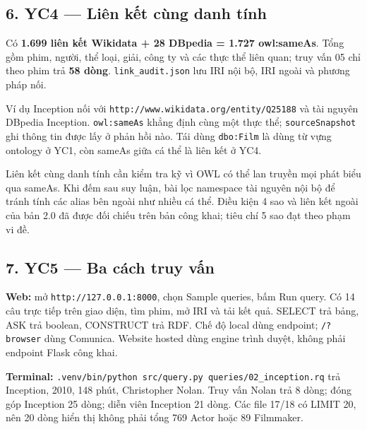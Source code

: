 \documentclass[
  11pt,
]{article}
\begin{document}
\newpage

\subsection{6. YC4 --- Liên kết cùng danh
tính}\label{yc4-liuxean-kux1ebft-cuxf9ng-danh-tuxednh}

Có \textbf{1.699 liên kết Wikidata + 28 DBpedia = 1.727 owl:sameAs}.
Tổng gồm phim, người, thể loại, giải, công ty và các thực thể liên quan;
truy vấn 05 chỉ theo phim trả \textbf{58 dòng}.
\texttt{link\_\allowbreak{}aud\allowbreak{}it.\allowbreak{}json} lưu IRI
nội bộ, IRI ngoài và phương pháp nối.

Ví dụ Inception nối với
\texttt{http:\allowbreak{}/\allowbreak{}/\allowbreak{}w\allowbreak{}ww.\allowbreak{}wikid\allowbreak{}ata.\allowbreak{}org/\allowbreak{}entity/\allowbreak{}\allowbreak{}Q\allowbreak{}25188}
và tài nguyên DBpedia Inception.
\texttt{owl:\allowbreak{}same\allowbreak{}\allowbreak{}As} khẳng định
cùng một thực thể; \texttt{source\allowbreak{}Sn\allowbreak{}apshot} ghi
thông tin được lấy ở phản hồi nào. Tái dùng
\texttt{dbo:\allowbreak{}\allowbreak{}Film\allowbreak{}} là dùng từ vựng
ontology ở YC1, còn sameAs giữa cá thể là liên kết ở YC4.

Liên kết cùng danh tính cần kiểm tra kỹ vì OWL có thể lan truyền mọi
phát biểu qua sameAs. Khi đếm sau suy luận, bài lọc namespace tài nguyên
nội bộ để tránh tính các alias bên ngoài như nhiều cá thể. Điều kiện 4
sao và liên kết ngoài của bản 2.0 đã được đối chiếu trên bản công khai;
tiêu chí 5 sao đạt theo phạm vi đề.

\subsection{7. YC5 --- Ba cách truy
vấn}\label{yc5-ba-cuxe1ch-truy-vux1ea5n}

\textbf{Web:} mở
\texttt{http:\allowbreak{}/\allowbreak{}/\allowbreak{}1\allowbreak{}27.\allowbreak{}0.\allowbreak{}0.\allowbreak{}1\allowbreak{}:\allowbreak{}8000},
chọn Sample queries, bấm Run query. Có 14 câu trực tiếp trên giao diện,
tìm phim, mở IRI và tải kết quả. SELECT trả bảng, ASK trả boolean,
CONSTRUCT trả RDF. Chế độ local dùng endpoint;
\texttt{/\allowbreak{}?browse\allowbreak{}r} dùng Comunica. Website
hosted dùng engine trình duyệt, không phải endpoint Flask công khai.

\textbf{Terminal:}
\texttt{.\allowbreak{}venv/\allowbreak{}bi\allowbreak{}n/\allowbreak{}python\allowbreak{} src/\allowbreak{}que\allowbreak{}ry.\allowbreak{}py qu\allowbreak{}eries/\allowbreak{}02\allowbreak{}\_\allowbreak{}incepti\allowbreak{}on.\allowbreak{}rq}
trả Inception, 2010, 148 phút, Christopher Nolan. Truy vấn Nolan trả 8
dòng; đóng góp Inception 25 dòng; diễn viên Inception 21 dòng. Các file
17/18 có LIMIT 20, nên 20 dòng hiển thị không phải tổng 769 Actor hoặc
89 Filmmaker.
\end{document}
